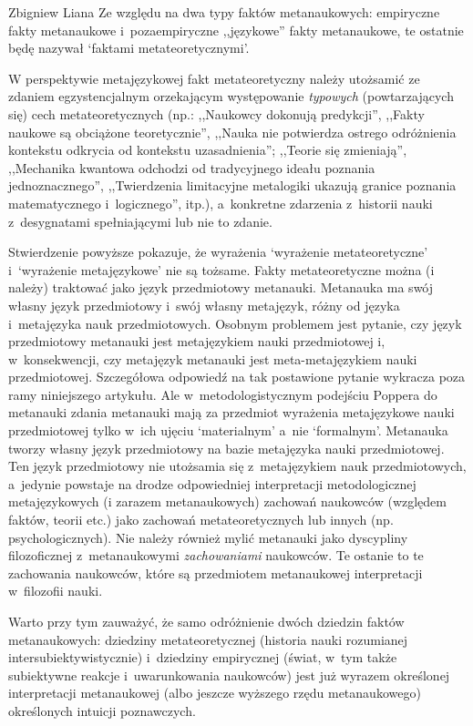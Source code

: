 \begin{artplenv}{Zbigniew Liana}
Ze względu na dwa typy faktów metanaukowych: empiryczne fakty metanaukowe i~pozaempiryczne ,,językowe'' fakty metanaukowe,
te ostatnie będę nazywał `faktami metateoretycznymi'.

W perspektywie metajęzykowej fakt metateoretyczny należy utożsamić ze zdaniem egzystencjalnym orzekającym występowanie
\textit{typowych} (powtarzających się) cech metateoretycznych (np.: ,,Naukowcy dokonują predykcji'', ,,Fakty naukowe są
obciążone teoretycznie'', ,,Nauka nie potwierdza ostrego odróżnienia kontekstu odkrycia od kontekstu uzasadnienia'';
,,Teorie się zmieniają'', ,,Mechanika kwantowa odchodzi od tradycyjnego ideału poznania jednoznacznego'', ,,Twierdzenia
limitacyjne metalogiki ukazują granice poznania matematycznego i~logicznego'', itp.), a~konkretne zdarzenia z~historii
nauki z~desygnatami spełniającymi lub nie to zdanie. 

Stwierdzenie powyższe pokazuje, że wyrażenia `wyrażenie metateoretyczne' i~`wyrażenie metajęzykowe' nie są tożsame.
Fakty metateoretyczne można (i należy) traktować jako język przedmiotowy metanauki. Metanauka ma swój własny język
przedmiotowy i~swój własny metajęzyk, różny od języka i~metajęzyka nauk przedmiotowych. Osobnym problemem jest pytanie,
czy język przedmiotowy metanauki jest metajęzykiem nauki przedmiotowej i, w~konsekwencji, czy metajęzyk metanauki jest
meta-metajęzykiem nauki przedmiotowej. Szczegółowa odpowiedź na tak postawione pytanie wykracza poza ramy niniejszego
artykułu. Ale w~metodologistycznym podejściu Poppera do metanauki zdania metanauki mają za przedmiot wyrażenia
metajęzykowe nauki przedmiotowej tylko w~ich ujęciu `materialnym' a~nie `formalnym'. Metanauka tworzy własny język
przedmiotowy na bazie metajęzyka nauki przedmiotowej. Ten język przedmiotowy nie utożsamia się z~metajęzykiem nauk
przedmiotowych, a~jedynie powstaje na drodze odpowiedniej interpretacji metodologicznej metajęzykowych (i zarazem
metanaukowych) zachowań naukowców (względem faktów, teorii etc.) jako zachowań metateoretycznych lub innych (np.
psychologicznych). Nie należy również mylić metanauki jako dyscypliny filozoficznej z~metanaukowymi \textit{zachowaniami}
naukowców. Te ostanie to te zachowania naukowców, które są przedmiotem metanaukowej interpretacji w~filozofii nauki.

Warto przy tym zauważyć, że samo odróżnienie dwóch dziedzin faktów metanaukowych: dziedziny metateoretycznej (historia
nauki rozumianej intersubiektywistycznie) i~dziedziny empirycznej (świat, w~tym także subiektywne reakcje i~uwarunkowania
naukowców) jest już wyrazem określonej interpretacji metanaukowej (albo jeszcze wyższego rzędu
metanaukowego) określonych intuicji poznawczych.


\end{artplenv}
